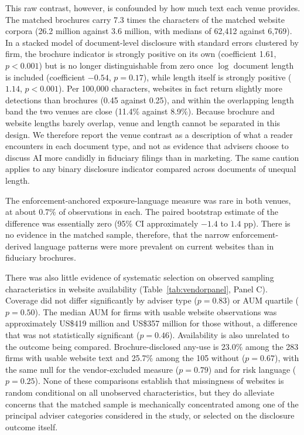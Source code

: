 \documentclass[utf8]{FrontiersinHarvard}
\begin{document}
This raw contrast, however, is confounded by how much text each venue provides. The matched brochures carry 7.3 times the characters of the matched website corpora (26.2 million against 3.6 million, with medians of 62{,}412 against 6{,}769). In a stacked model of document-level disclosure with standard errors clustered by firm, the brochure indicator is strongly positive on its own (coefficient 1.61, $p < 0.001$) but is no longer distinguishable from zero once $\log$ document length is included (coefficient $-0.54$, $p = 0.17$), while length itself is strongly positive ($1.14$, $p < 0.001$). Per 100{,}000 characters, websites in fact return slightly more detections than brochures (0.45 against 0.25), and within the overlapping length band the two venues are close (11.4\% against 8.9\%). Because brochure and website lengths barely overlap, venue and length cannot be separated in this design. We therefore report the venue contrast as a description of what a reader encounters in each document type, and not as evidence that advisers choose to discuss AI more candidly in fiduciary filings than in marketing. The same caution applies to any binary disclosure indicator compared across documents of unequal length.

The enforcement-anchored exposure-language measure was rare in both venues, at about 0.7\% of observations in each. The paired bootstrap estimate of the difference was essentially zero (95\% CI approximately $-1.4$ to $1.4$ pp). There is no evidence in the matched sample, therefore, that the narrow enforcement-derived language patterns were more prevalent on current websites than in fiduciary brochures.

There was also little evidence of systematic selection on observed sampling characteristics in website availability (Table~\ref{tab:vendorpanel}, Panel C). Coverage did not differ significantly by adviser type ($p = 0.83$) or AUM quartile ($p = 0.50$). The median AUM for firms with usable website observations was approximately US\$419 million and US\$357 million for those without, a difference that was not statistically significant ($p = 0.46$). Availability is also unrelated to the outcome being compared. Brochure-disclosed any-use is 23.0\% among the 283 firms with usable website text and 25.7\% among the 105 without ($p = 0.67$), with the same null for the vendor-excluded measure ($p = 0.79$) and for risk language ($p = 0.25$). None of these comparisons establish that missingness of websites is random conditional on all unobserved characteristics, but they do alleviate concerns that the matched sample is mechanically concentrated among one of the principal adviser categories considered in the study, or selected on the disclosure outcome itself.
\end{document}
